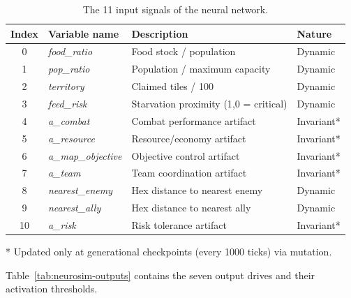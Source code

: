 \begin{table}[h]
  \centering
  \caption{The 11 input signals of the neural network.}
  \label{tab:neurosim-inputs}
  \begin{tabular}{|c|l|l|l|}
    \hline
    \textbf{Index} & \textbf{Variable name} & \textbf{Description} & \textbf{Nature} \\
    \hline
    0 & \textit{food\_ratio}         & Food stock / population                    & Dynamic \\
    1 & \textit{pop\_ratio}          & Population / maximum capacity               & Dynamic \\
    2 & \textit{territory}           & Claimed tiles / 100                         & Dynamic \\
    3 & \textit{feed\_risk}          & Starvation proximity (1{,}0 = critical)    & Dynamic \\
    4 & \textit{a\_combat}           & Combat performance artifact                  & Invariant* \\
    5 & \textit{a\_resource}         & Resource/economy artifact                    & Invariant* \\
    6 & \textit{a\_map\_objective}   & Objective control artifact                   & Invariant* \\
    7 & \textit{a\_team}             & Team coordination artifact                   & Invariant* \\
    8 & \textit{nearest\_enemy}      & Hex distance to nearest enemy               & Dynamic \\
    9 & \textit{nearest\_ally}       & Hex distance to nearest ally                & Dynamic \\
   10 & \textit{a\_risk}             & Risk tolerance artifact                      & Invariant* \\
    \hline
  \end{tabular}
  \begin{flushleft}
    \small{* Updated only at generational checkpoints (every 1000 ticks) via mutation.}
  \end{flushleft}
\end{table}

Table~\ref{tab:neurosim-outputs} contains the seven output drives and their activation thresholds.

